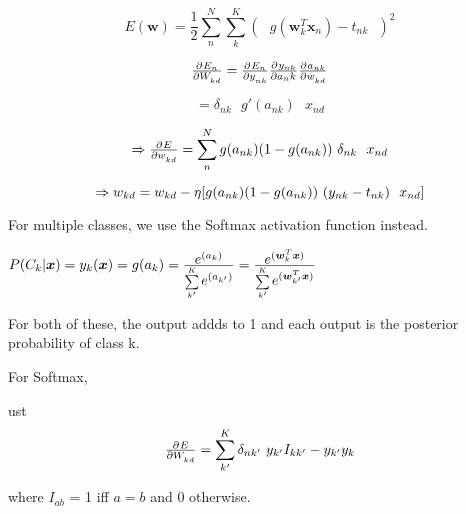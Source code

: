 \documentclass[10pt,a4paper]{article}
\newcommand{\su}[2]{\sum\limits_{#1}^{#2}}
\newcommand{\re}[1]{\frac{1}{#1}}
\begin{document}
	\begin{equation*}
		E(\bm w) = \re{2} \su{n}{N} \su{k}{K}(\text{ } g(\bm w_k^T \bm x_n)\text{} - t_{nk}\text{ })^2
	\end{equation*}
	
	\begin{equation*}
		\pd{E_n}{W_{kd}} = \pd{E_n}{y_{nk}} \pd{y_{nk}}{a_nk{}} \pd{a_{nk}}{w_{kd}}
	\end{equation*}
	
	\begin{equation*}
		= \delta_{nk}\text{ }g'(a_{nk})\text{ }x_{nd}
	\end{equation*}
	
	\begin{equation*}
	\Rightarrow \pd{E}{w_{kd}} = \su{n}{N} g(a_{nk})(1-g(a_{nk}))\text{ }\delta_{nk}\text{ }\text{ }x_{nd}
	\end{equation*}
	
	\begin{equation*}
	\Rightarrow w_{kd} = w_{kd} - {\Huge \eta}[  g(a_{nk})(1-g(a_{nk}))\text{ }(y_{nk} - t_{nk})\text{ }\text{ }x_{nd} ]
	\end{equation*}
	
	For multiple classes, we use the Softmax activation function instead.
	\begin{center}
		$
			P(C_k | \bm x) = y_k(\bm x) = g(a_k) 
			= \frac{\mathlarger{e^{(a_k)}}}{\sum\limits_{k'}^K \mathlarger{e^{(a_{k'})}}} 
			= \frac{\mathlarger{e^{(\bm w_{k}^T \bm x)}}}{\sum\limits_{k'}^K \mathlarger{e^{(\bm w_{k'}^T \bm x)}}} 
		$
	\end{center}	
	
	For both of these, the output addds to 1 and each output is the posterior probability of class k.
	
	For Softmax, 
	
	ust 
	\begin{equation*}
		\pd{E}{W_{kd}} = \su{k'}{K} \delta_{nk'}\text{ }y_{k'}I_{kk'} - y_{k'}y_k
	\end{equation*}
	
	where $I_{ab}$ = 1 iff $a = b$ and 0 otherwise.
	
\end{document}
